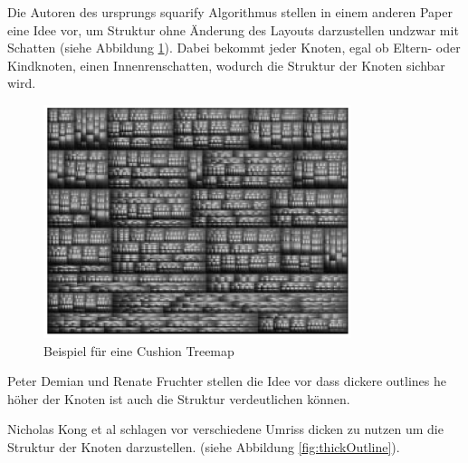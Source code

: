 Die Autoren des ursprungs squarify Algorithmus \cite{bruls2000squarified} stellen in einem anderen Paper \cite{cushionTreemaps} eine Idee vor, um Struktur ohne Änderung des Layouts darzustellen undzwar mit Schatten (siehe Abbildung \ref{fig:cushion}). Dabei bekommt jeder Knoten, egal ob Eltern- oder Kindknoten, einen Innenrenschatten, wodurch die Struktur der Knoten sichbar wird.

\begin{figure}
    \centering
    \includegraphics[width=0.8\textwidth]{images/cushionTreemap.png}
    \caption{Beispiel für eine Cushion Treemap \cite[4]{cushionTreemaps}}
    \label{fig:cushion}
\end{figure}

Peter Demian und Renate Fruchter stellen die Idee vor dass dickere outlines he höher der Knoten ist auch die Struktur verdeutlichen können. 

Nicholas Kong et al schlagen vor verschiedene Umriss dicken zu nutzen um die Struktur der Knoten darzustellen.\cite{2010-perception-treemaps} (siehe Abbildung \ref{fig:thickOutline}).

